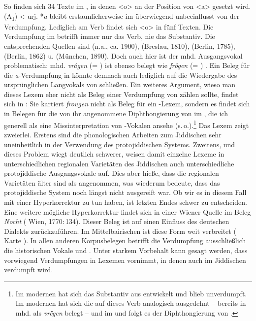 So finden sich 34 Texte im , in denen <o> an der Position von <a> gesetzt wird.  (A\textsubscript{1}) < urj. *\textit{a\textlengthmark} bleibt erstaunlicherweise im  überwiegend unbeeinflusst von der Verdumpfung. Lediglich am Verb  findet sich <o> in fünf Texten. Die Verdumpfung im  betrifft immer nur das Verb, nie das Substantiv. Die entsprechenden Quellen sind  (n.a., ca. 1900),  (Breslau, 1810),  (Berlin, 1785),  (Berlin, 1862) u.  (München, 1890). Doch auch hier ist der mhd. Ausgangsvokal problematisch: mhd. \textit{vrâgen} (= ) ist ebenso belegt wie \textit{frôgen} (= ) \parencite[Bd. 3, Sp. 487]{Lexer1992}. Ein Beleg für die \textit{a}-Verdumpfung in  könnte demnach auch lediglich auf die  Wiedergabe des ursprünglichen Langvokals von  schließen. Ein weiteres Argument, wieso man dieses Lexem eher nicht als Beleg einer Verdumpfung von  zählen sollte, findet sich in \textcite[60f]{GuggenheimGruenberg1973}: Sie kartiert \textit{frougen} nicht als Beleg für ein -Lexem, sondern  es findet sich in Belegen für die von ihr angenommene Diphthongierung von  im , die ich  generell als eine Missinterpretation von -Vokalen ansehe (s.\,o.).\footnote{Im modernen  hat sich das Substantiv    aus  entwickelt und blieb unverdumpft. Im modernen  hat sich die  auf dieses Verb analogisch ausgedehnt – bereits in mhd. als \textit{vrëgen} belegt  \parencite[Bd. 3, Sp. 487]{Lexer1992} – und im  und  folgt es der Diphthongierung von   .} Das Lexem  zeigt zweierlei. Erstens sind die phonologischen Arbeiten zum Jiddischen sehr uneinheitlich in der Verwendung des protojiddischen Systems. Zweitens, und dieses Problem wiegt deutlich schwerer, weisen damit einzelne Lexeme in unterschiedlichen regionalen Varietäten des Jiddischen auch unterschiedliche protojiddische Ausgangsvokale auf. Dies aber hieße, dass die regionalen Varietäten älter sind als angenommen, was wiederum bedeute, dass das protojiddische System noch längst nicht ausgereift war. Ob wir es in diesem Fall mit einer Hyperkorrektur zu tun haben, ist letzten Endes schwer zu entscheiden. Eine weitere mögliche Hyperkorrektur  findet sich in einer Wiener Quelle im Beleg \textit{Nocht}  ( Wien, 1770:\,134). Dieser Beleg ist auf einen Einfluss des deutschen Dialekts zurückzuführen. Im Mittelbairischen ist diese Form weit verbreitet ( Karte ). In allen anderen Korpusbelegen betrifft die Verdumpfung ausschließlich die historischen Vokale  und . Unter starkem Vorbehalt kann gesagt werden, dass  vorwiegend Verdumpfungen in Lexemen vornimmt, in denen auch im Jiddischen verdumpft wird. 

